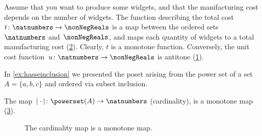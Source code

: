 \begin{example}
    Assume that you want to produce some widgets, and that the manifacturing cost depends on the number of widgets.
    The function describing the total cost~$t\colon \natnumbers\to \nonNegReals$ is a map between the ordered sets~$\natnumbers$ and~$\nonNegReals$, and maps each quantity of widgets to a total manufacturing cost (\cref{fig:total_manufacturing}).
    Clearly, $t$ is a monotone function.
    Conversely, the unit cost function~$u\colon \natnumbers\to \nonNegReals$ is antitone (\cref{fig:unit_manufacturing}).
\end{example}

\begin{figure}[h!]
    \caption{}
    \label{fig:unit_manufacturing}
\end{figure}

\begin{figure}[h!]
    \caption{}
    \label{fig:total_manufacturing}
\end{figure}





\begin{example}
\end{example}

\begin{example}
    In \cref{ex:hasseinclusion} we presented the poset arising from the power set of a set~$A=\{a,b,c\}$ and ordered via subset inclusion.

    The map~$\vert \cdot \vert \colon \powerset(A)\to \natnumbers$ (cardinality), is a monotone map (\cref{fig:cardinality}).
    \begin{figure}[h!]
        \begin{center}
        \end{center}
        \caption{The cardinality map is a monotone map. \label{fig:cardinality}}
    \end{figure}
\end{example}


